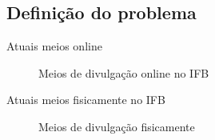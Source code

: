 \documentclass{aula-ifb}
\begin{document}
\subsection{Definição do problema}
\begin{frame}{Atuais meios online}
\begin{figure}[h]
  \centering
  \quad %
  \caption{Meios de divulgação online no IFB}
\label{fig1}
\end{figure}
\end{frame}

\begin{frame}{Atuais meios fisicamente no IFB}
\begin{figure}[h]
  \centering
  \quad %
  \caption{Meios de divulgação fisicamente}
\label{fig1}
\end{figure}
\end{frame}
\end{document}
